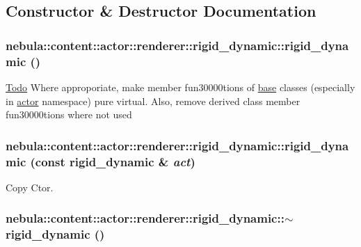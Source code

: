 \subsection{Constructor \& Destructor Documentation}
\hypertarget{classnebula_1_1content_1_1actor_1_1renderer_1_1rigid__dynamic_a1769b910cd702811d55a80c4d37b3df9}{
\subsubsection[{rigid\_\-dynamic}]{\setlength{\rightskip}{0pt plus 5cm}nebula::content::actor::renderer::rigid\_\-dynamic::rigid\_\-dynamic ()}}
\label{classnebula_1_1content_1_1actor_1_1renderer_1_1rigid__dynamic_a1769b910cd702811d55a80c4d37b3df9}
\begin{Desc}
\item[\hyperlink{todo__todo000004}{Todo}]Where approporiate, make member fun30000tions of \hyperlink{classnebula_1_1content_1_1actor_1_1renderer_1_1base}{base} classes (especially in \hyperlink{classnebula_1_1content_1_1actor_1_1renderer_1_1actor}{actor} namespace) pure virtual. Also, remove derived class member fun30000tions where not used \end{Desc}
\hypertarget{classnebula_1_1content_1_1actor_1_1renderer_1_1rigid__dynamic_ac8c70a2348e70444a882d6356d921846}{
\subsubsection[{rigid\_\-dynamic}]{\setlength{\rightskip}{0pt plus 5cm}nebula::content::actor::renderer::rigid\_\-dynamic::rigid\_\-dynamic (const {\bf rigid\_\-dynamic} \& {\em act})}}
\label{classnebula_1_1content_1_1actor_1_1renderer_1_1rigid__dynamic_ac8c70a2348e70444a882d6356d921846}


Copy Ctor. \hypertarget{classnebula_1_1content_1_1actor_1_1renderer_1_1rigid__dynamic_a87d93301fdc8a6eb335b620f95c4c0a3}{
\subsubsection[{$\sim$rigid\_\-dynamic}]{\setlength{\rightskip}{0pt plus 5cm}nebula::content::actor::renderer::rigid\_\-dynamic::$\sim$rigid\_\-dynamic ()}}
\label{classnebula_1_1content_1_1actor_1_1renderer_1_1rigid__dynamic_a87d93301fdc8a6eb335b620f95c4c0a3}


